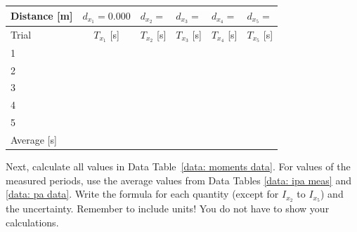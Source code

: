 \documentclass[addpoints]{physlabs}
\begin{document}
\begin{postlab}
    \begin{center}
        \renewcommand{\arraystretch}{2.25}
        \captionsetup{font=normalsize}
        \begin{tabular}{|p{2.2cm}|p{2.2cm}|p{2.2cm}|p{2.2cm}|p{2.2cm}|p{2.2cm}|}
        \hline
        Distance [m]  & $d_{x_1}=0.000$ & $d_{x_2}=$ & $d_{x_3}=$ & $d_{x_4}=$ & $d_{x_5}=$
        \\
        \hline
        Trial         & \multicolumn{1}{|c|}{$T_{x_1}$ [s]} & \multicolumn{1}{|c|}{$T_{x_2}$ [s]}  & \multicolumn{1}{|c|}{$T_{x_3}$ [s]}  & \multicolumn{1}{|c|}{$T_{x_4}$ [s]}  & \multicolumn{1}{|c|}{$T_{x_5}$ [s]}
        \\
        \hline\hline
        1             &                               &            &            &            &       \\
        \hline
        2             &                               &            &            &            &       \\
        \hline
        3             &                               &            &            &            &       \\
        \hline
        4             &                               &            &            &            &       \\
        \hline
        5             &                               &            &            &            &       \\
        \hline\hline
        Average [s] &                               &            &            &            &      
        \\
        \hline
        \end{tabular}
    \end{center}

    \newpage
    Next, calculate all values in Data Table~\ref{data: moments data}. For values of the measured periods, use the average values from Data Tables \ref{data: ipa meas} and \ref{data: pa data}. Write the formula for each quantity (except for $I_{x_2}$ to $I_{x_5}$) and the uncertainty. Remember to include units! You do not have to show your calculations.


\end{postlab}
\end{document}
